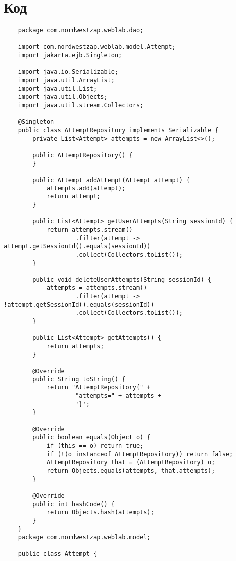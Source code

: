 \documentclass{article}
\begin{document}
\section{Код}
\begin{verbatim}
    package com.nordwestzap.weblab.dao;

    import com.nordwestzap.weblab.model.Attempt;
    import jakarta.ejb.Singleton;
    
    import java.io.Serializable;
    import java.util.ArrayList;
    import java.util.List;
    import java.util.Objects;
    import java.util.stream.Collectors;
    
    @Singleton
    public class AttemptRepository implements Serializable {
        private List<Attempt> attempts = new ArrayList<>();
    
        public AttemptRepository() {
        }
    
        public Attempt addAttempt(Attempt attempt) {
            attempts.add(attempt);
            return attempt;
        }
    
        public List<Attempt> getUserAttempts(String sessionId) {
            return attempts.stream()
                    .filter(attempt -> attempt.getSessionId().equals(sessionId))
                    .collect(Collectors.toList());
        }
    
        public void deleteUserAttempts(String sessionId) {
            attempts = attempts.stream()
                    .filter(attempt -> !attempt.getSessionId().equals(sessionId))
                    .collect(Collectors.toList());
        }
    
        public List<Attempt> getAttempts() {
            return attempts;
        }
    
        @Override
        public String toString() {
            return "AttemptRepository{" +
                    "attempts=" + attempts +
                    '}';
        }
    
        @Override
        public boolean equals(Object o) {
            if (this == o) return true;
            if (!(o instanceof AttemptRepository)) return false;
            AttemptRepository that = (AttemptRepository) o;
            return Objects.equals(attempts, that.attempts);
        }
    
        @Override
        public int hashCode() {
            return Objects.hash(attempts);
        }
    }
    package com.nordwestzap.weblab.model;

    public class Attempt {
    

\end{verbatim}
\end{document}
